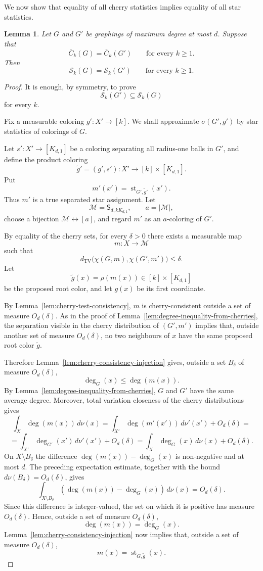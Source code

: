 \documentclass[11pt]{amsart}
\newcommand{\calS}{\mathcal S}
\newcommand{\TV}{\operatorname{TV}}
\newtheorem{lemma}[theorem]{Lemma}
\theoremstyle{remark}
\begin{document}
We now show that equality of all cherry statistics implies equality of all star statistics.

\begin{lemma}\label{lem:cherries-determine-stars}
Let $G$ and $G'$ be graphings of maximum degree at most $d$. Suppose that
\[
 \overline C_k(G)=\overline C_k(G')
 \qquad\text{for every }k\geq 1.
\]
Then
\[
 \calS_k(G)=\calS_k(G')
 \qquad\text{for every }k\geq 1.
\]
\end{lemma}

\begin{proof}
It is enough, by symmetry, to prove
\[
 \calS_k(G')\subseteq\calS_k(G)
\]
for every $k$.

Fix a measurable coloring $g'\colon X'\to[k]$. We shall approximate $\sigma(G',g')$ by star statistics of colorings of $G$.

Let $s'\colon X'\to[K_{d,1}]$ be a coloring separating all radius-one balls in $G'$, and define the product coloring
\[
 \widetilde g'=(g',s')\colon X'\to[k]\times[K_{d,1}].
\]
Put
\[
 m'(x')=\operatorname{st}_{G',\widetilde g'}(x').
\]
Thus $m'$ is a true separated star assignment. Let
\[
 \mathcal M=\mathsf S_{d,kK_{d,1}},\qquad a=|\mathcal M|,
\]
choose a bijection $\mathcal M\leftrightarrow[a]$, and regard $m'$ as an $a$-coloring of $G'$.

By equality of the cherry sets, for every $\delta>0$ there exists a measurable map
\[
 m\colon X\to\mathcal M
\]
such that
\[
 d_{\TV}\bigl(\chi(G,m),\chi(G',m')\bigr)\leq\delta.
\]
Let
\[
 \widetilde g(x)=\rho(m(x))\in[k]\times[K_{d,1}]
\]
be the proposed root color, and let $g(x)$ be its first coordinate.

By Lemma~\ref{lem:cherry-test-consistency}, $m$ is cherry-consistent outside a set of measure $O_d(\delta)$. As in the proof of Lemma~\ref{lem:degree-inequality-from-cherries}, the separation visible in the cherry distribution of $(G',m')$ implies that, outside another set of measure $O_d(\delta)$, no two neighbours of $x$ have the same proposed root color $\widetilde g$.

Therefore Lemma~\ref{lem:cherry-consistency-injection} gives, outside a set $B_\delta$ of measure $O_d(\delta)$,
\[
 \deg_G(x)\leq\deg(m(x)).
\]
By Lemma~\ref{lem:degree-inequality-from-cherries}, $G$ and $G'$ have the same average degree. Moreover, total variation closeness of the cherry distributions gives
\[
 \int_X\deg(m(x))\,d\nu(x)=\int_{X'}\deg(m'(x'))\,d\nu'(x')+O_d(\delta)=
\]
\[=\int_{X'}\deg_{G'}(x')\,d\nu'(x')+O_d(\delta)
 =\int_X\deg_G(x)\,d\nu(x)+O_d(\delta).
\]
On $X\setminus B_\delta$ the difference $\deg(m(x))-\deg_G(x)$ is non-negative and at most $d$.  The preceding expectation estimate, together with the bound $d\nu(B_\delta)=O_d(\delta)$, gives
\[
 \int_{X\setminus B_\delta}(\deg(m(x))-\deg_G(x))\,d\nu(x)=O_d(\delta).
\]
Since this difference is integer-valued, the set on which it is positive has measure $O_d(\delta)$. Hence, outside a set of measure $O_d(\delta)$,
\[
 \deg(m(x))=\deg_G(x).
\]
Lemma~\ref{lem:cherry-consistency-injection} now implies that, outside a set of measure $O_d(\delta)$,
\[
 m(x)=\operatorname{st}_{G,\widetilde g}(x).
\]


\end{proof}
\end{document}
